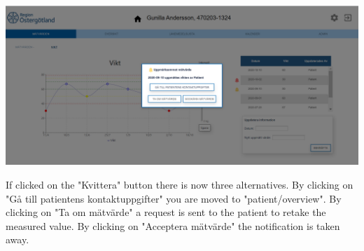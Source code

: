 \begin{center}
    \includegraphics[width=\linewidth]{images/single_patient_weight_measurements_handle2_image.png}
    \label{fig:figures}
\end{center}
If clicked on the "Kvittera" button there is now three alternatives. By clicking on "Gå till patientens kontaktuppgifter" you are moved to "patient/overview". By clicking on "Ta om mätvärde" a request is sent to the patient to retake the measured value. By clicking on "Acceptera mätvärde" the notification is taken away.
\\